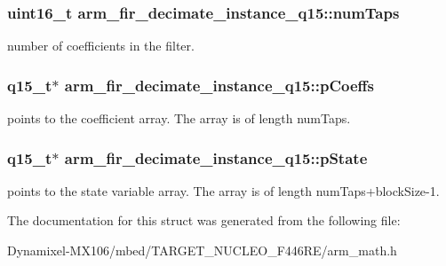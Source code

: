 \subsubsection[{\texorpdfstring{num\+Taps}{numTaps}}]{\setlength{\rightskip}{0pt plus 5cm}uint16\+\_\+t arm\+\_\+fir\+\_\+decimate\+\_\+instance\+\_\+q15\+::num\+Taps}\hypertarget{structarm__fir__decimate__instance__q15_ac1e9844488ec717da334fbd4c4f41990}{}\label{structarm__fir__decimate__instance__q15_ac1e9844488ec717da334fbd4c4f41990}
number of coefficients in the filter. 
\subsubsection[{\texorpdfstring{p\+Coeffs}{pCoeffs}}]{\setlength{\rightskip}{0pt plus 5cm}q15\+\_\+t$\ast$ arm\+\_\+fir\+\_\+decimate\+\_\+instance\+\_\+q15\+::p\+Coeffs}\hypertarget{structarm__fir__decimate__instance__q15_a01cacab67e73945e8289075598ede14d}{}\label{structarm__fir__decimate__instance__q15_a01cacab67e73945e8289075598ede14d}
points to the coefficient array. The array is of length num\+Taps. 
\subsubsection[{\texorpdfstring{p\+State}{pState}}]{\setlength{\rightskip}{0pt plus 5cm}q15\+\_\+t$\ast$ arm\+\_\+fir\+\_\+decimate\+\_\+instance\+\_\+q15\+::p\+State}\hypertarget{structarm__fir__decimate__instance__q15_a3f7b5184bb28853ef401b001df121047}{}\label{structarm__fir__decimate__instance__q15_a3f7b5184bb28853ef401b001df121047}
points to the state variable array. The array is of length num\+Taps+block\+Size-\/1. 

The documentation for this struct was generated from the following file\+:\begin{DoxyCompactItemize}
\item 
Dynamixel-\/\+M\+X106/mbed/\+T\+A\+R\+G\+E\+T\+\_\+\+N\+U\+C\+L\+E\+O\+\_\+\+F446\+R\+E/arm\+\_\+math.\+h\end{DoxyCompactItemize}
